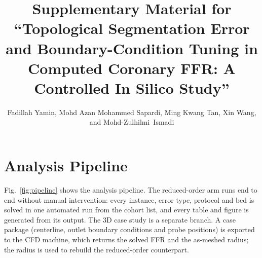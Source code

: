 \documentclass[journal,twoside,web,onecolumn]{ieeecolor}
\begin{document}
\sloppy
\title{Supplementary Material for ``Topological Segmentation Error and Boundary-Condition Tuning in Computed Coronary
FFR: A Controlled In Silico Study''}
\author{Fadillah Yamin, Mohd Azan Mohammed Sapardi, Ming Kwang Tan, Xin Wang, and \mbox{Mohd-Zulhilmi Ismadi}\endgraf\vspace{-\baselineskip}}
\maketitle

\section{Analysis Pipeline}
Fig.~\ref{fig:pipeline} shows the analysis pipeline. The reduced-order arm
runs end to end without manual intervention: every instance, error type, protocol and bed is solved in one automated run
from the cohort list, and every table and figure is generated from its output. The 3D case study is a separate
branch. A case package (centerline, outlet boundary conditions and probe positions) is exported to the CFD machine,
which returns the solved FFR and the as-meshed radius; the radius is used to rebuild the reduced-order counterpart.
\end{document}
